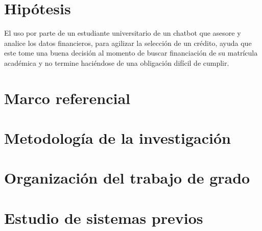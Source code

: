 \section{Hipótesis}
El uso por parte de un estudiante universitario de un chatbot que asesore y analice los datos financieros, para agilizar la selección de un crédito, ayuda que este tome una buena decisión al momento de buscar financiación de su matrícula académica y no termine haciéndose de una obligación difícil de cumplir.
\newpage

\section{Marco referencial}
\newpage

\section{Metodología de la investigación}
\newpage

\section{Organización del trabajo de grado}
\newpage

\section{Estudio de sistemas previos}
\newpage